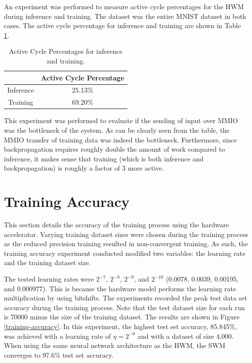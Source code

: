 An experiment was performed to measure active cycle percentages for the HWM during inference and training. The dataset was the entire MNIST dataset in both cases. The active cycle percentage for inference and training are shown in Table \ref{active-cycle-table}.

\begin{table}
	\centering 
	\begin{tabular}{|c|c|}
		\hline
		& \textbf{Active Cycle Percentage} \\\hline
		Inference & 25.13\% \\\hline 
		Training & 69.20\% \\\hline
	\end{tabular}
	\caption{Active Cycle Percentages for inference and training.}
	\label{active-cycle-table}
\end{table}

This experiment was performed to evaluate if the sending of input over MMIO was the bottleneck of the system. As can be clearly seen from the table, the MMIO transfer of training data was indeed the bottleneck. Furthermore, since backpropagation requires roughly double the amount of work compared to inference, it makes sense that training (which is both inference and backpropagation) is roughly a factor of 3 more active.

\section{Training Accuracy}
This section details the accuracy of the training process using the hardware accelerator. Varying training dataset sizes were chosen during the training process as the reduced precision training resulted in non-convergent training. As such, the training accuracy experiment conducted modified two variables: the learning rate and the training dataset size. 

The tested learning rates were $2^{-7}$, $2^{-8}$, $2^{-9}$, and $2^{-10}$ (0.0078, 0.0039, 0.00195, and 0.000977). This is because the hardware model performs the learning rate multiplication by using bitshifts. The experiments recorded the peak test data set accuracy during the training process. Note that the test dataset size for each run is 70000 minus the size of the training dataset. The results are shown in Figure \ref{training-accuracy}. In this experiment, the highest test set accuracy, 85.845\%, was achieved with a learning rate of $\eta = 2^{-9}$ and with a dataset of size 4,000. When using the same neural network architecture as the HWM, the SWM converges to 97.6\% test set accuracy.

